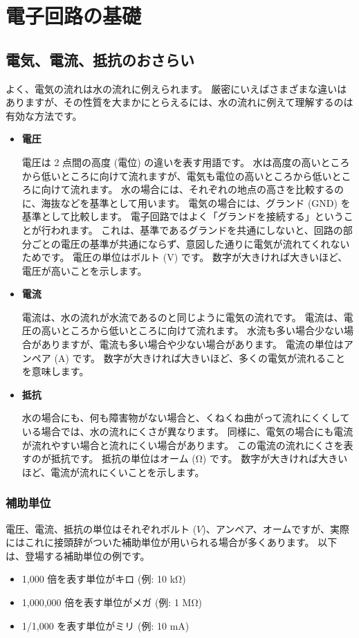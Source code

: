 \documentclass[11pt,a4paper]{jarticle}
\begin{document}
\section{電子回路の基礎}

\subsection*{電気、電流、抵抗のおさらい}
よく、電気の流れは水の流れに例えられます。
厳密にいえばさまざまな違いはありますが、その性質を大まかにとらえるには、水の流れに例えて理解するのは有効な方法です。

\begin{itemize}
 \item \textbf{電圧}
       
       電圧は 2 点間の高度 (電位) の違いを表す用語です。
       水は高度の高いところから低いところに向けて流れますが、電気も電位の高いところから低いところに向けて流れます。
       水の場合には、それぞれの地点の高さを比較するのに、海抜などを基準として用います。
       電気の場合には、グランド (GND) を基準として比較します。
       電子回路ではよく「グランドを接続する」ということが行われます。
       これは、基準であるグランドを共通にしないと、回路の部分ごとの電圧の基準が共通にならず、意図した通りに電気が流れてくれないためです。
       電圧の単位はボルト (V) です。
       数字が大きければ大きいほど、電圧が高いことを示します。

 \item \textbf{電流}
      
       電流は、水の流れが水流であるのと同じように電気の流れです。
       電流は、電圧の高いところから低いところに向けて流れます。
       水流も多い場合少ない場合がありますが、電流も多い場合や少ない場合があります。
       電流の単位はアンペア (A) です。
       数字が大きければ大きいほど、多くの電気が流れることを意味します。

 \item \textbf{抵抗}
       
       水の場合にも、何も障害物がない場合と、くねくね曲がって流れにくくしている場合では、水の流れにくさが異なります。
       同様に、電気の場合にも電流が流れやすい場合と流れにくい場合があります。
       この電流の流れにくさを表すのが抵抗です。
       抵抗の単位はオーム (Ω) です。
       数字が大きければ大きいほど、電流が流れにくいことを示します。

\end{itemize}


\subsubsection*{補助単位}
電圧、電流、抵抗の単位はそれぞれボルト ($V$)、アンペア、オームですが、実際にはこれに接頭辞がついた補助単位が用いられる場合が多くあります。
以下は、登場する補助単位の例です。
\begin{itemize}
 \item 1,000 倍を表す単位がキロ (例: 10 kΩ)
 \item 1,000,000 倍を表す単位がメガ (例: 1 MΩ)
 \item 1/1,000 を表す単位がミリ (例: 10 mA)
\end{itemize}
\end{document}
